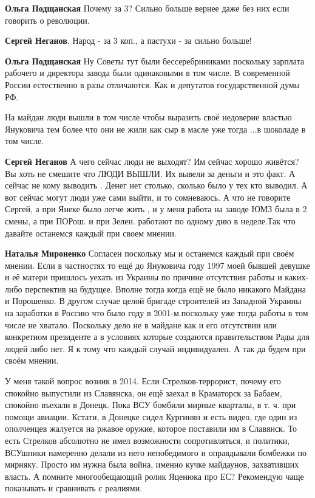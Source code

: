 \begin{itemize}
\begin{itemize}
\textbf{Ольга Подщанская} Почему за 3? Сильно больше вернее даже без них если говорить о революции.

\textbf{Сергей Неганов}. Народ - за 3 коп., а пастухи - за сильно больше!

\textbf{Ольга Подщанская} Ну Советы тут были бессеребриниками поскольку зарплата рабочего и директора завода были одинаковыми в том числе.
В современной России естественно в разы отличаются.
Как и депутатов государственной думы РФ.

\end{itemize} %


На майдан люди вышли в том числе чтобы выразить своё недоверие властью
Януковича тем более что они не жили как сыр в масле уже тогда ...в шоколаде в
том числе.

\begin{itemize} %
\textbf{Сергей Неганов} А чего сейчас люди не выходят? Им сейчас хорошо живётся? Вы хоть не смешите что ЛЮДИ ВЫШЛИ. Их вывели за деньги и это факт. А сейчас не кому выводить . Денег нет столько, сколько было у тех кто выводил. А вот сейчас могут люди уже сами выйти, и то сомневаюсь. А что не говорите Сергей, а при Янеке было легче жить , и у меня работа на заводе ЮМЗ была в 2 смены, а при ПОРош. и при Зелен. работают по одному дню в неделе.Так что давайте останемся каждый при своем мнении.

\textbf{Наталья Мироненко} Согласен поскольку мы и останемся каждый при своём мнении.
Если в частностях то ещё до Януковича году 1997 моей бывшей девушке и её матери пришлось уехать из Украины по причине отсутствия работы и каких-либо перспектив на будущее.
Вполне тогда когда ещё не было никакого Майдана и Порошенко.
В другом случае целой бригаде строителей из Западной Украины на заработки в Россию что было году в 2001-м.поскольку уже тогда работы в том числе не хватало.
Поскольку дело не в майдане как и его отсутствии или конкретном президенте а в условиях которые создаются правительством Рады для людей либо нет.
Я к тому что каждый случай индивидуален.
А так да будем при своём мнении.
\end{itemize} %


У меня такой вопрос возник в 2014. Если Стрелков-террорист, почему его спокойно
выпустили из Славянска, он ещё заехал в Краматорск за Бабаем, спокойно въехали
в Донецк. Пока ВСУ бомбили мирные кварталы, в т. ч. при помощи авиации. Кстати, в
Донецке сидел Кургинян и есть видео, где один из ополченцев жалуется на ржавое
оружие, которое поставили им в Славянск. То есть Стрелков абсолютно не имел
возможности сопротивляться, и политики, ВСУшники намеренно делали из него
непобедимого и оправдывали бомбежки по мирняку. Просто им нужна была война,
именно кучке майдаунов, захвативших власть. А помните многообещающий ролик
Яценюка про ЕС? Рекомендую чаще показывать и сравнивать с реалиями.


\end{itemize}
